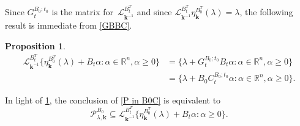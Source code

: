 \documentclass{amsart}
\newtheorem{proposition}{Proposition}[section]
\theoremstyle{definition}
\theoremstyle{remark}
\numberwithin{equation}{section}
\newcommand{\reals}{\mathbb R}
\newcommand{\sett}[1]{{\bigl\lbrace #1 \bigr\rbrace}}
\newcommand{\0}{{\mathbf{0}}}
\newcommand{\kk}{{\boldsymbol{k}}}
\renewcommand{\L}{\mathcal{L}}
\renewcommand{\P}{\mathcal{P}}
\begin{document}
Since $G_t^{B_0;t_0}$ is the matrix for~$\L_{\kk^{-1}}^{B_t^T}$ and since $\L_{\kk^{-1}}^{B_t^T}\eta_\kk^{B_0^T}(\lambda)=\lambda$, the following result is immediate from \cref{GBBC}.

\begin{proposition}\label{B0C}
\begin{align*}
\L_{\kk^{-1}}^{B_t^T}\sett{\eta_\kk^{B_0^T}(\lambda)+B_t\alpha:\alpha\in\reals^n,\alpha\ge0}
&=\sett{\lambda+G_t^{B_0;t_0}B_t\alpha:\alpha\in\reals^n,\alpha\ge0}\\
&=\sett{\lambda+B_0C_t^{B_0;t_0}\alpha:\alpha\in\reals^n,\alpha\ge0}.
\end{align*}
\end{proposition}

In light of \cref{B0C}, the conclusion of \cref{P in B0C} is equivalent to
\[\P^{B_0}_{\lambda,\kk}\subseteq\L_{\kk^{-1}}^{B_t^T}\sett{\eta_\kk^{B_0^T}(\lambda)+B_t\alpha:\alpha\ge0}.\]
\end{document}
